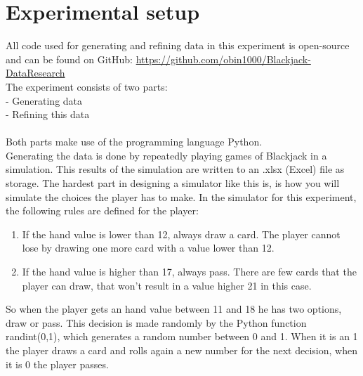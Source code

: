 \section{Experimental setup}
All code used for generating and refining data in this experiment is open-source and can be found on GitHub: \url{https://github.com/obin1000/Blackjack-DataResearch} \\
The experiment consists of two parts: \\
- Generating data \\
- Refining this data \\
 \\
Both parts make use of the programming language Python. \\
Generating the data is done by repeatedly playing games of Blackjack in a simulation. This results of the simulation are written to an .xlsx (Excel) file as storage. The hardest part in designing a simulator like this is, is how you will simulate the choices the player has to make. In the simulator for this experiment, the following rules are defined for the player:
\begin{enumerate}
  \item If the hand value is lower than 12, always draw a card. The player cannot lose by drawing one more card with a value lower than 12.
  \item If the hand value is higher than 17, always pass. There are few cards that the player can draw, that won't result in a value higher 21 in this case. \\
\end{enumerate}
So when the player gets an hand value between 11 and 18 he has two options, draw or pass. This decision is made randomly by the Python function randint(0,1), which generates a random number between 0 and 1. When it is an 1 the player draws a card and rolls again a new number for the next decision, when it is 0 the player passes.

